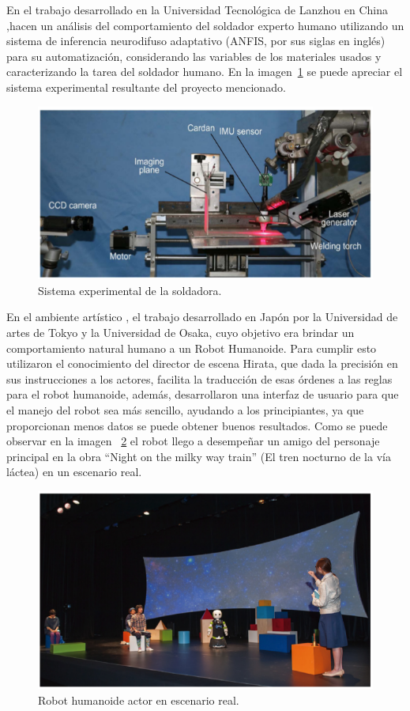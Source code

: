 En el trabajo desarrollado en la Universidad Tecnológica de Lanzhou en China
 \cite{Zhang2017},hacen un análisis del comportamiento del soldador experto
 humano utilizando un sistema de inferencia neurodifuso adaptativo (ANFIS,
 por sus siglas en inglés) para su automatización, considerando las variables
 de los materiales usados y caracterizando la tarea del soldador humano.
 En la imagen~\ref{fig:syswelding} se puede apreciar el sistema experimental
  resultante del proyecto mencionado.


\begin{figure}[H]
\centering
\includegraphics[width=0.8\columnwidth]{CapituloI/Imagenes/Welding.png}
\caption{Sistema experimental de la soldadora.}
\label{fig:syswelding}
\end{figure} 
 

En el ambiente artístico \cite{Nishiguchi2017}, el trabajo desarrollado en
 Japón por la Universidad de artes de Tokyo y la Universidad de Osaka, cuyo
 objetivo era brindar un comportamiento natural humano a un Robot Humanoide.
 Para cumplir esto utilizaron el conocimiento del director de escena Hirata,
 que dada la precisión en sus instrucciones a los actores, facilita la
 traducción de esas órdenes a las reglas para el robot humanoide, además,
 desarrollaron una interfaz de usuario para que el manejo del robot sea más
 sencillo, ayudando a los principiantes, ya que proporcionan menos datos se
 puede obtener buenos resultados. Como se puede observar en la imagen
 ~\ref{fig:theatricalrob} el robot llego a desempeñar un amigo del
 personaje principal en la obra ``Night on the milky way train''
 (El tren nocturno de la vía láctea) en un escenario real.


\begin{figure}[H]
\centering
\includegraphics[width=0.8\columnwidth]{CapituloI/Imagenes/Theatrical.png}
\caption{Robot humanoide actor en escenario real.}
\label{fig:theatricalrob}
\end{figure} 


